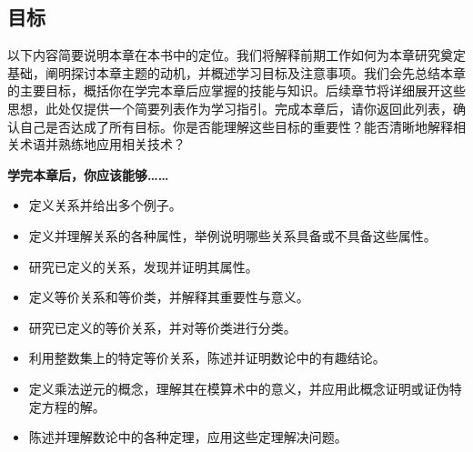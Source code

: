 
\subsection{目标}

以下内容简要说明本章在本书中的定位。我们将解释前期工作如何为本章研究奠定基础，阐明探讨本章主题的动机，并概述学习目标及注意事项。我们会先总结本章的主要目标，概括你在学完本章后应掌握的技能与知识。后续章节将详细展开这些思想，此处仅提供一个简要列表作为学习指引。完成本章后，请你返回此列表，确认自己是否达成了所有目标。你是否能理解这些目标的重要性？能否清晰地解释相关术语并熟练地应用相关技术？

\textbf{学完本章后，你应该能够……}

\begin{itemize}
    \item 定义关系并给出多个例子。
    \item 定义并理解关系的各种属性，举例说明哪些关系具备或不具备这些属性。
    \item 研究已定义的关系，发现并证明其属性。
    \item 定义等价关系和等价类，并解释其重要性与意义。
    \item 研究已定义的等价关系，并对等价类进行分类。
    \item 利用整数集上的特定等价关系，陈述并证明数论中的有趣结论。
    \item 定义乘法逆元的概念，理解其在模算术中的意义，并应用此概念证明或证伪特定方程的解。
    \item 陈述并理解数论中的各种定理，应用这些定理解决问题。
\end{itemize}